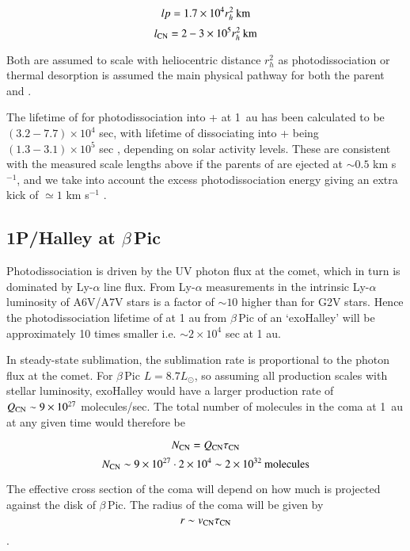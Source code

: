\documentclass{aa}
\newcommand{\kms}{km s$^{-1}$}
\newcommand{\bp}{$\beta$\,Pic}
\begin{document}
$$lp=1.7\times10^4r_h^2\:{\rm km}$$
$$l_{\ce{CN}}=2-3\times10^5r_h^2\:{\rm km}$$

Both are assumed to scale with heliocentric distance $r_h^2$ as photodissociation or thermal desorption is assumed the main physical pathway for both the parent and .

The lifetime of  for photodissociation into + at 1~au has been calculated to be $(3.2-7.7)\times10^4$ sec, with lifetime of  dissociating into + being $(1.3-3.1)\times10^5$ sec \citep{Huebner92}, depending on solar activity levels.
%
These are consistent with the measured scale lengths above if the parents of  are ejected at $\sim 0.5$ \kms{}, and we take into account the excess photodissociation energy giving  an extra kick of $\simeq1$ \kms{} \citep{Combi1980}. 

\subsection{1P/Halley at \texorpdfstring{\bp{}}{Beta Pictoris}}

Photodissociation is  driven by the UV photon flux at the comet, which in turn is dominated by Ly-$\alpha$ line flux. From Ly-$\alpha$ measurements in \citet{Landsman93} the intrinsic Ly-$\alpha$ luminosity of A6V/A7V stars is a factor of $\sim10$ higher than for G2V stars.
%
Hence the photodissociation lifetime of   at 1 au from \bp{} of an `exoHalley' will be approximately 10 times smaller i.e. $\sim 2\times10^4$ sec at 1 au.

In steady-state sublimation, the sublimation rate is proportional to the photon flux at the comet.
%
For \bp{} $L=8.7L_\odot$, so assuming all  production scales with stellar luminosity, exoHalley would have a larger  production rate of $Q_{\ce{CN}}\sim 9\times10^{27}$ molecules/sec.
%
The total number of  molecules in the coma at 1~au at any given time would therefore be

$$N_{\ce{CN}}=Q_{\ce{CN}} \tau_{\ce{CN}}$$
$$N_{\ce{CN}}\sim 9\times10^{27} \cdot  2\times10^4 \sim 2\times10^{32}\:{\rm molecules}$$

The effective cross section of the coma will depend on how much is projected against the disk of \bp{}.
%
The radius of the  coma will be given by
$$r\sim v_{\ce{CN}} \tau_{\ce{CN}}$$.
\end{document}
